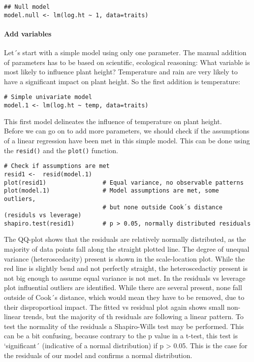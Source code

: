 \documentclass[
]{article}
\begin{document}
\begin{verbatim}
## Null model 
model.null <- lm(log.ht ~ 1, data=traits)
\end{verbatim}

\hypertarget{add-variables}{%
\paragraph{Add variables}\label{add-variables}}

Let´s start with a simple model using only one parameter. The manual
addition of parameters has to be based on scientific, ecological
reasoning: What variable is most likely to influence plant height?
Temperature and rain are very likely to have a significant impact on
plant height. So the first addition is temperature:

\begin{verbatim}
# Simple univariate model
model.1 <- lm(log.ht ~ temp, data=traits)
\end{verbatim}

This first model delineates the influence of temperature on plant
height.\\
Before we can go on to add more parameters, we should check if the
assumptions of a linear regression have been met in this simple model.
This can be done using the \texttt{resid()} and the \texttt{plot()}
function.

\begin{verbatim}
# Check if assumptions are met 
resid1 <-  resid(model.1)
plot(resid1)                # Equal variance, no observable patterns
plot(model.1)               # Model assumptions are met, some outliers, 
                            # but none outside Cook´s distance (residuls vs leverage)
shapiro.test(resid1)        # p > 0.05, normally distributed residuals
\end{verbatim}

The QQ-plot shows that the residuals are relatively normally
distributed, as the majority of data points fall along the straight
plotted line. The degree of unequal variance (heteroscedacity) present
is shown in the scale-location plot. While the red line is slightly bend
and not perfectly straight, the heteroscedactiy present is not big
enough to assume equal variance is not met. In the residuals vs leverage
plot influential outliers are identified. While there are several
present, none fall outside of Cook´s distance, which would mean they
have to be removed, due to their disproportioal impact. The fitted vs
residual plot again shows small non-linear trends, but the majority of
th residuals are following a linear pattern. To test the normality of
the residuals a Shapiro-Wills test may be performed. This can be a bit
confusing, because contrary to the p value in a t-test, this test is
`significant´ (indicative of a normal distribution) if p \textgreater{}
0.05. This is the case for the residuals of our model and confirms a
normal distribution.
\end{document}
